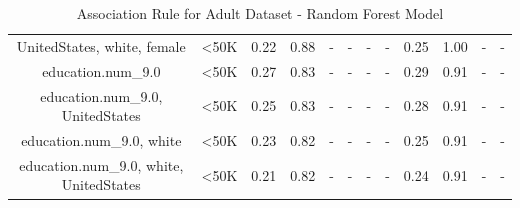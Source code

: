 \begin{table}[H]
{\begin{tabular}{|c|c|c|c|c|c|c|c|c|c|c|c|}
UnitedStates, white, female & <50K & 0.22 & 0.88 & - & - & - & - & 0.25 & 1.00 & - & - \\
education.num\_9.0 & <50K & 0.27 & 0.83 & - & - & - & - & 0.29 & 0.91 & - & - \\
education.num\_9.0, UnitedStates & <50K & 0.25 & 0.83 & - & - & - & - & 0.28 & 0.91 & - & - \\
education.num\_9.0, white & <50K & 0.23 & 0.82 & - & - & - & - & 0.25 & 0.91 & - & - \\
education.num\_9.0, white, UnitedStates & <50K & 0.21 & 0.82 & - & - & - & - & 0.24 & 0.91 & - & - \\
        \hline
        \end{tabular}
        }
        \\[10pt]
        \caption{Association Rule for Adult Dataset - Random Forest Model}
        \label{table:asso_rules_adult_Random Forest}
        \end{table}
        